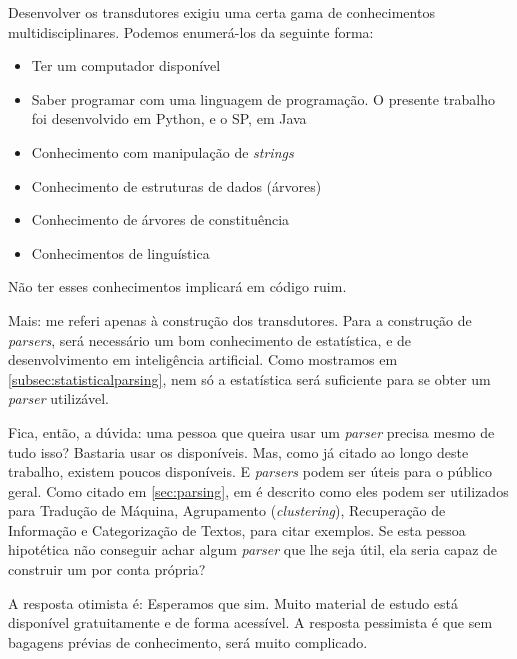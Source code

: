 Desenvolver os transdutores exigiu uma certa gama de conhecimentos multidisciplinares. 
Podemos enumerá-los da seguinte forma:
\begin{itemize}
    \item Ter um computador disponível
    \item Saber programar com uma linguagem de programação. O presente trabalho foi desenvolvido em Python, e o SP, em Java
    \item Conhecimento com manipulação de \textit{strings}
    \item Conhecimento de estruturas de dados (árvores)
    \item Conhecimento de árvores de constituência
    \item Conhecimentos de linguística
\end{itemize}
Não ter esses conhecimentos implicará em código ruim. 

Mais: me referi apenas à construção dos transdutores. Para a construção de \textit{parsers}, será necessário um bom conhecimento de estatística, e de desenvolvimento em inteligência artificial. Como mostramos em \ref{subsec:statisticalparsing}, nem só a estatística será suficiente para se obter um \textit{parser} utilizável.

Fica, então, a dúvida: uma pessoa que queira usar um \textit{parser} precisa mesmo de tudo isso? Bastaria usar os disponíveis. Mas, como já citado ao longo deste trabalho, existem poucos disponíveis. E \textit{parsers} podem ser úteis para o público geral. 
Como citado em \ref{sec:parsing}, em \cite{Manning1999FoundationsNLP} é descrito como eles podem ser utilizados para Tradução de Máquina, Agrupamento (\textit{clustering}), Recuperação de Informação e Categorização de Textos, para citar exemplos.
Se esta pessoa hipotética não conseguir achar algum \textit{parser} que lhe seja útil, ela seria capaz de construir um por conta própria?

A resposta otimista é: Esperamos que sim. Muito material de estudo está disponível gratuitamente e de forma acessível. A resposta pessimista é que sem bagagens prévias de conhecimento, será muito complicado.
